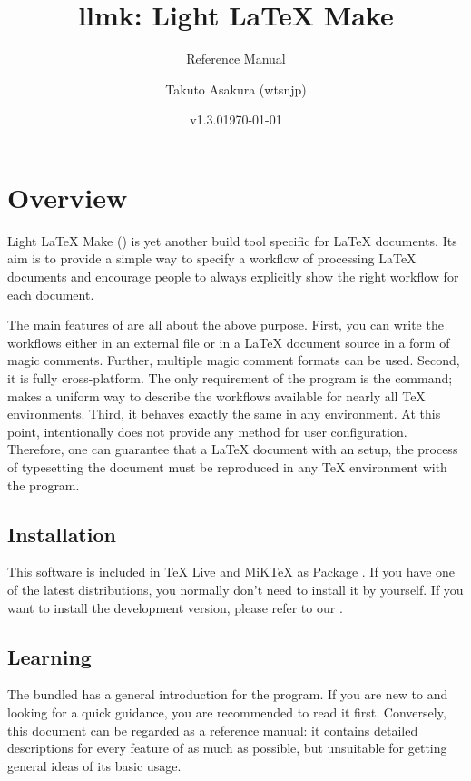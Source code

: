 \documentclass{llmk-doc}
\title{llmk: Light {\LaTeX} Make}
\author{Takuto Asakura (wtsnjp)}
\subtitle{Reference Manual}
\date{v1.3.0\quad\today}
\begin{document}
\maketitle

\section{Overview}

Light {\LaTeX} Make () is yet another build tool specific for
{\LaTeX} documents. Its aim is to provide a simple way to specify a workflow of
processing {\LaTeX} documents and encourage people to always explicitly show
the right workflow for each document.

The main features of  are all about the above purpose. First, you
can write the workflows either in an external file  or in a
{\LaTeX} document source in a form of magic comments. Further, multiple magic
comment formats can be used. Second, it is fully cross-platform. The only
requirement of the program is the  command;  makes a
uniform way to describe the workflows available for nearly all {\TeX}
environments. Third, it behaves exactly the same in any environment. At this
point,  intentionally does not provide any method for user
configuration. Therefore, one can guarantee that a {\LaTeX} document with an
 setup, the process of typesetting the document must be reproduced
in any {\TeX} environment with the program.

\subsection{Installation}

This software is included in {\TeX} Live and MiK{\TeX} as Package
. If you have one of the latest distributions, you
normally don't need to install it by yourself. If you want to install the
development version, please refer to our {\README}.

\subsection{Learning }

The bundled {\README} has a general introduction for the program. If you are
new to  and looking for a quick guidance, you are recommended to
read it first. Conversely, this document can be regarded as a reference manual:
it contains detailed descriptions for every feature of  as much as
possible, but unsuitable for getting general ideas of its basic usage.
\end{document}
